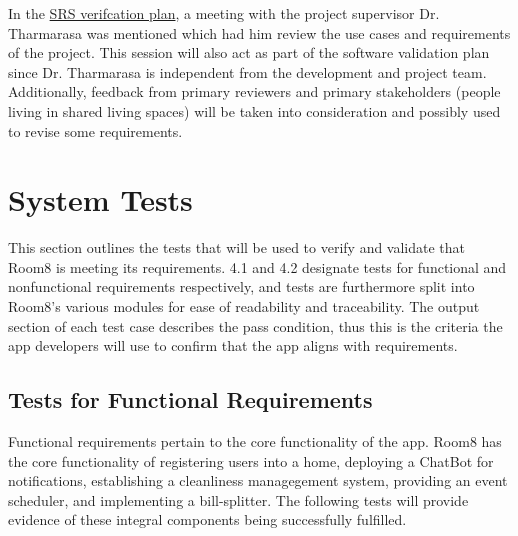 \documentclass[12pt, titlepage]{article}
\begin{document}



In the \hyperref[section:SRSVerificationPlan]{SRS verifcation plan}, a meeting with the project supervisor Dr. Tharmarasa was mentioned which had him review the use cases and requirements of the project. This session will also act as part of the software validation plan since Dr. Tharmarasa is independent from the development and project team. Additionally, feedback from primary reviewers and primary stakeholders (people living in shared living spaces) will be taken into consideration and possibly used to revise some requirements.  
\section{System Tests}
\label{section:systemTests}

This section outlines the tests that will be used to verify and validate that Room8 is meeting its requirements. 4.1 and 4.2 designate tests for functional and nonfunctional requirements respectively, and tests are furthermore split into Room8's various modules for ease of readability and traceability. The output section of each test case describes the pass condition, thus this is the criteria the app developers will use to confirm that the app aligns with requirements. 

\subsection{Tests for Functional Requirements}


Functional requirements pertain to the core functionality of the app. Room8 has the core functionality of registering users into a home, deploying a ChatBot for notifications, establishing a cleanliness managegement system, providing an event scheduler, and implementing a bill-splitter. The following tests will provide evidence of these integral components being successfully fulfilled.
\end{document}
